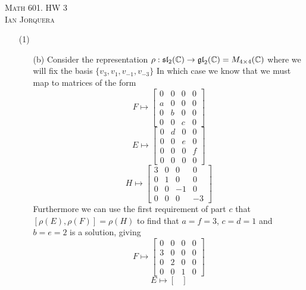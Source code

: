 \documentclass[12pt]{amsart}
\begin{document}
\begin{center}
    \textsc{Math 601. HW 3\\ Ian Jorquera}
\end{center}
\vspace{1em}
\begin{itemize}
    \item[(1)] %
    \begin{itemize}
        \item[(b)] %
        Consider the representation $\rho:\mathfrak{sl}_2(\mathbb{C})\rightarrow\mathfrak{gl}_2(\mathbb{C})=M_{4\times 4}(\mathbb{C})$ 
        where we will fix the basis $\{v_3,v_1,v_{-1},v_{-3}\}$ In which case we know that we must map to matrices of the form
        \[F\mapsto\begin{bmatrix}
            0&0&0&0\\
            a&0&0&0\\
            0&b&0&0\\
            0&0&c&0
        \end{bmatrix}\]
        \[E\mapsto\begin{bmatrix}
            0&d&0&0\\
            0&0&e&0\\
            0&0&0&f\\
            0&0&0&0
        \end{bmatrix}\]
        \[H\mapsto\begin{bmatrix}
            3&0&0&0\\
            0&1&0&0\\
            0&0&-1&0\\
            0&0&0&-3
        \end{bmatrix}\]
        Furthermore we can use the first requirement of part $c$ that $[\rho(E),\rho(F)]=\rho(H)$ to find that $a=f=3$, $c=d=1$ and $b=e=2$ is a solution, giving
        \[F\mapsto\begin{bmatrix}
            0&0&0&0\\
            3&0&0&0\\
            0&2&0&0\\
            0&0&1&0
        \end{bmatrix}\]
        \[E\mapsto\begin{bmatrix}

\end{bmatrix}\]
\end{itemize}
\end{itemize}
\end{document}
